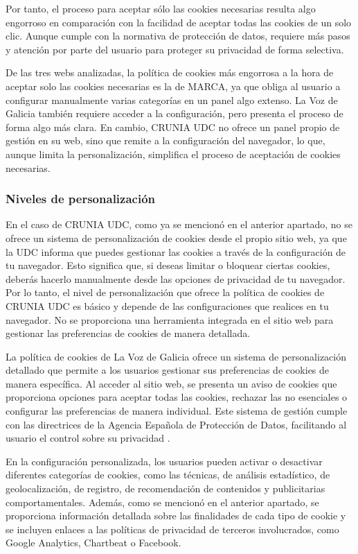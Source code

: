 Por tanto, el proceso para aceptar sólo las cookies necesarias resulta algo engorroso en comparación con la facilidad de aceptar todas las cookies de un solo clic. Aunque cumple con la normativa de protección de datos, requiere más pasos y atención por parte del usuario para proteger su privacidad de forma selectiva.

De las tres webs analizadas, la política de cookies más engorrosa a la hora de aceptar solo las cookies necesarias es la de MARCA, ya que obliga al usuario a configurar manualmente varias categorías en un panel algo extenso. La Voz de Galicia también requiere acceder a la configuración, pero presenta el proceso de forma algo más clara. En cambio, CRUNIA UDC no ofrece un panel propio de gestión en su web, sino que remite a la configuración del navegador, lo que, aunque limita la personalización, simplifica el proceso de aceptación de cookies necesarias.


\subsubsection{Niveles de personalización}

En el caso de CRUNIA UDC, como ya se mencionó en el anterior apartado, no se ofrece un sistema de personalización de cookies desde el propio sitio web, ya que la UDC informa que puedes gestionar las cookies a través de la configuración de tu navegador. Esto significa que, si deseas limitar o bloquear ciertas cookies, deberás hacerlo manualmente desde las opciones de privacidad de tu navegador. Por lo tanto, el nivel de personalización que ofrece la política de cookies de CRUNIA UDC es básico y depende de las configuraciones que realices en tu navegador. No se proporciona una herramienta integrada en el sitio web para gestionar las preferencias de cookies de manera detallada.

La política de cookies de La Voz de Galicia ofrece un sistema de personalización detallado que permite a los usuarios gestionar sus preferencias de cookies de manera específica. Al acceder al sitio web, se presenta un aviso de cookies que proporciona opciones para aceptar todas las cookies, rechazar las no esenciales o configurar las preferencias de manera individual. Este sistema de gestión cumple con las directrices de la Agencia Española de Protección de Datos, facilitando al usuario el control sobre su privacidad \cite{AEPD}.

En la configuración personalizada, los usuarios pueden activar o desactivar diferentes categorías de cookies, como las técnicas, de análisis estadístico, de geolocalización, de registro, de recomendación de contenidos y publicitarias comportamentales. Además, como se mencionó en el anterior apartado, se proporciona información detallada sobre las finalidades de cada tipo de cookie y se incluyen enlaces a las políticas de privacidad de terceros involucrados, como Google Analytics, Chartbeat o Facebook.

